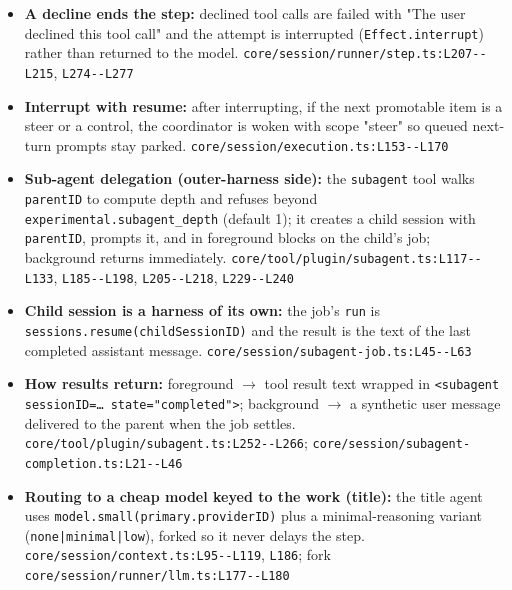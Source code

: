 \begin{itemize}
\item \textbf{A decline ends the step:} declined tool calls are failed with "The user declined this tool call" and the attempt is interrupted (\texttt{Effect.\allowbreak{}interrupt}) rather than returned to the model. \texttt{core/\allowbreak{}session/\allowbreak{}runner/\allowbreak{}step.\allowbreak{}ts:\allowbreak{}L207-\allowbreak{}-\allowbreak{}L215}, \texttt{L274-\allowbreak{}-\allowbreak{}L277}
\item \textbf{Interrupt with resume:} after interrupting, if the next promotable item is a steer or a control, the coordinator is woken with scope "steer" so queued next-turn prompts stay parked. \texttt{core/\allowbreak{}session/\allowbreak{}execution.\allowbreak{}ts:\allowbreak{}L153-\allowbreak{}-\allowbreak{}L170}
\item \textbf{Sub-agent delegation (outer-harness side):} the \texttt{subagent} tool walks \texttt{parentID} to compute depth and refuses beyond \texttt{experimental.\allowbreak{}subagent\_\allowbreak{}depth} (default 1); it creates a child session with \texttt{parentID}, prompts it, and in foreground blocks on the child's job; background returns immediately. \texttt{core/\allowbreak{}tool/\allowbreak{}plugin/\allowbreak{}subagent.\allowbreak{}ts:\allowbreak{}L117-\allowbreak{}-\allowbreak{}L133}, \texttt{L185-\allowbreak{}-\allowbreak{}L198}, \texttt{L205-\allowbreak{}-\allowbreak{}L218}, \texttt{L229-\allowbreak{}-\allowbreak{}L240}
\item \textbf{Child session is a harness of its own:} the job's \texttt{run} is \texttt{sessions.\allowbreak{}resume(\allowbreak{}childSessionID)} and the result is the text of the last completed assistant message. \texttt{core/\allowbreak{}session/\allowbreak{}subagent-\allowbreak{}job.\allowbreak{}ts:\allowbreak{}L45-\allowbreak{}-\allowbreak{}L63}
\item \textbf{How results return:} foreground $\rightarrow$ tool result text wrapped in \texttt{<subagent sessionID=\ldots{} state="completed">}; background $\rightarrow$ a synthetic user message delivered to the parent when the job settles. \texttt{core/\allowbreak{}tool/\allowbreak{}plugin/\allowbreak{}subagent.\allowbreak{}ts:\allowbreak{}L252-\allowbreak{}-\allowbreak{}L266}; \texttt{core/\allowbreak{}session/\allowbreak{}subagent-\allowbreak{}completion.\allowbreak{}ts:\allowbreak{}L21-\allowbreak{}-\allowbreak{}L46}
\item \textbf{Routing to a cheap model keyed to the work (title):} the title agent uses \texttt{model.\allowbreak{}small(\allowbreak{}primary.\allowbreak{}providerID)} plus a minimal-reasoning variant (\texttt{none|minimal|low}), forked so it never delays the step. \texttt{core/\allowbreak{}session/\allowbreak{}context.\allowbreak{}ts:\allowbreak{}L95-\allowbreak{}-\allowbreak{}L119}, \texttt{L186}; fork \texttt{core/\allowbreak{}session/\allowbreak{}runner/\allowbreak{}llm.\allowbreak{}ts:\allowbreak{}L177-\allowbreak{}-\allowbreak{}L180}

\end{itemize}
